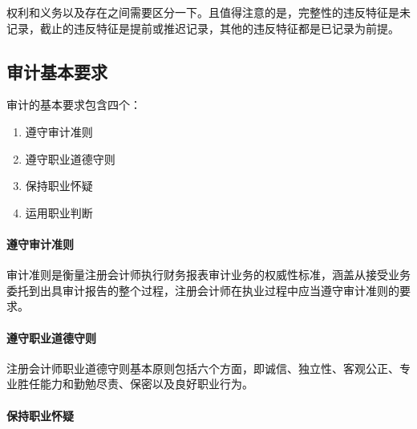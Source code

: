 \documentclass[UTF8,12pt]{ctexart}
\numberwithin{equation}{section} %
\numberwithin{figure}{section}
\numberwithin{table}{section}
\begin{document}
	权利和义务以及存在之间需要区分一下。且值得注意的是，完整性的违反特征是未记录，截止的违反特征是提前或推迟记录，其他的违反特征都是已记录为前提。
	
	\subsection{审计基本要求}
	审计的基本要求包含四个：
	\begin{enumerate}
		\item 遵守审计准则
		
		\item 遵守职业道德守则
		
		\item 保持职业怀疑
		
		\item 运用职业判断
	\end{enumerate}
	
	\paragraph{遵守审计准则}
	
	审计准则是衡量注册会计师执行财务报表审计业务的权威性标准，涵盖从接受业务委托到出具审计报告的整个过程，注册会计师在执业过程中应当遵守审计准则的要求。
	
	\paragraph{遵守职业道德守则}
	
	注册会计师职业道德守则基本原则包括六个方面，即诚信、独立性、客观公正、专业胜任能力和勤勉尽责、保密以及良好职业行为。
	
	\paragraph{保持职业怀疑}
\end{document}
